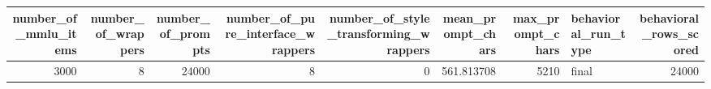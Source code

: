 \begin{tabular}{rrrrrrrlr}
\toprule
number\_of\_mmlu\_items & number\_of\_wrappers & number\_of\_prompts & number\_of\_pure\_interface\_wrappers & number\_of\_style\_transforming\_wrappers & mean\_prompt\_chars & max\_prompt\_chars & behavioral\_run\_type & behavioral\_rows\_scored \\
\midrule
3000 & 8 & 24000 & 8 & 0 & 561.813708 & 5210 & final & 24000 \\
\bottomrule
\end{tabular}
